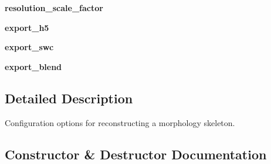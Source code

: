 \begin{DoxyCompactItemize}
\item 
{\bfseries resolution\+\_\+scale\+\_\+factor}\hypertarget{classmeshy_1_1neuromorphovis_1_1options_1_1morphology__options_1_1MorphologyOptions_a91998e517f48342fd8b5dbfcf5f0bbbf}{}\label{classmeshy_1_1neuromorphovis_1_1options_1_1morphology__options_1_1MorphologyOptions_a91998e517f48342fd8b5dbfcf5f0bbbf}

\item 
{\bfseries export\+\_\+h5}\hypertarget{classmeshy_1_1neuromorphovis_1_1options_1_1morphology__options_1_1MorphologyOptions_afd38f014791ec4eb9081613ab28d2bd2}{}\label{classmeshy_1_1neuromorphovis_1_1options_1_1morphology__options_1_1MorphologyOptions_afd38f014791ec4eb9081613ab28d2bd2}

\item 
{\bfseries export\+\_\+swc}\hypertarget{classmeshy_1_1neuromorphovis_1_1options_1_1morphology__options_1_1MorphologyOptions_a0d2d8e0172b8448db946a6d9f9028718}{}\label{classmeshy_1_1neuromorphovis_1_1options_1_1morphology__options_1_1MorphologyOptions_a0d2d8e0172b8448db946a6d9f9028718}

\item 
{\bfseries export\+\_\+blend}\hypertarget{classmeshy_1_1neuromorphovis_1_1options_1_1morphology__options_1_1MorphologyOptions_a8f751b2b5c179b3f502f62d049005f3b}{}\label{classmeshy_1_1neuromorphovis_1_1options_1_1morphology__options_1_1MorphologyOptions_a8f751b2b5c179b3f502f62d049005f3b}

\end{DoxyCompactItemize}


\subsection{Detailed Description}


\begin{DoxyVerb}Configuration options for reconstructing a morphology skeleton.
\end{DoxyVerb}
 

\subsection{Constructor \& Destructor Documentation}
